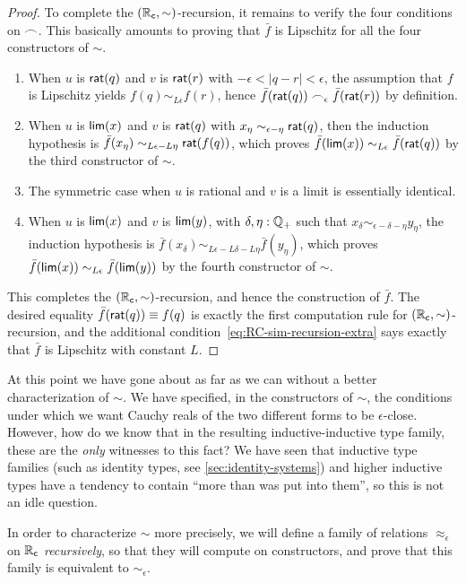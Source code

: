 \begin{proof}
  To complete the $(\mathbb{R}_\mathsf{c},\sim)$-recursion, it remains to verify the four conditions on $\frown$.
  This basically amounts to proving that $\bar f$ is Lipschitz for all the four constructors of $\sim$.
  \begin{enumerate}
  \item When $u$ is $\mathsf{rat}(q)$ and $v$ is $\mathsf{rat}(r)$ with $-\epsilon < |q-r| <\epsilon$, the assumption that $f$ is Lipschitz yields $f(q) \sim_{L\epsilon} f(r)$, hence $\bar{f}(\mathsf{rat}(q)) \frown_\epsilon \bar{f}(\mathsf{rat}(r))$ by definition.
  \item When $u$ is $\mathsf{lim}(x)$ and $v$ is $\mathsf{rat}(q)$ with $x_\eta \sim_{\epsilon - \eta} \mathsf{rat}(q)$, then the
      induction hypothesis is $\bar{f}(x_\eta) \sim_{L \epsilon - L \eta} \mathsf{rat}(f(q))$, which proves $\bar{f}(\mathsf{lim}(x)) \sim_{L \epsilon}
      \bar{f}(\mathsf{rat}(q))$ by the third constructor of $\sim$.
  \item The symmetric case when $u$ is rational and $v$ is a limit is essentially identical.
  \item When $u$ is $\mathsf{lim}(x)$ and $v$ is $\mathsf{lim}(y)$, with $\delta, \eta : \mathbb{Q}_{+}$ such that $x_\delta \sim_{\epsilon - \delta - \eta} y_\eta$,
      the induction hypothesis is $\bar{f}(x_\delta) \sim_{L \epsilon - L \delta - L \eta} \bar{f}(y_\eta)$, which proves $\bar{f}(\mathsf{lim}(x)) \sim_{L
        \epsilon} \bar{f}(\mathsf{lim}(y))$ by the fourth constructor of $\sim$.
  \end{enumerate}
  This completes the $(\mathbb{R}_\mathsf{c},\sim)$-recursion, and hence the construction of $\bar f$.
  The desired equality $\bar f(\mathsf{rat}(q))\equiv f(q)$ is exactly the first computation rule for $(\mathbb{R}_\mathsf{c},\sim)$-recursion, and the additional condition~\eqref{eq:RC-sim-recursion-extra} says exactly that $\bar f$ is Lipschitz with constant $L$.
\end{proof}

At this point we have gone about as far as we can without a better characterization of $\sim$.
We have specified, in the constructors of $\sim$, the conditions under which we want Cauchy reals of the two different forms to be $\epsilon$-close.
However, how do we know that in the resulting inductive-inductive type family, these are the \emph{only} witnesses to this fact?
We have seen that inductive type families (such as identity types, see \autoref{sec:identity-systems}) and higher inductive types have a tendency to contain ``more than was put into them'', so this is not an idle question.

In order to characterize $\sim$ more precisely, we will define a family of relations $\approx_\epsilon$ on $\mathbb{R}_\mathsf{c}$ \emph{recursively}, so that they will compute on constructors, and prove that this family is equivalent to $\sim_\epsilon$.

